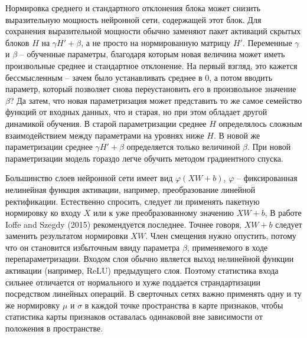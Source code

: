 \documentclass[%
	11pt,
	a4paper,
	utf8,
]{article}
\begin{document}
Нормировка среднего и стандартного отклонения блока может снизить выразительную мощность нейронной сети, содержащей этот блок. Для сохранения выразительной мощности обычно заменяют пакет активаций скрытых блоков $ H $ на $ \gamma H' + \beta $, а не просто на нормированную матрицу $ H' $. Переменные $ \gamma $ и $ \beta $ -- обученные параметры, благодаря которым новая величина может иметь произвольные среднее и стандартное отклонение. На первый взгляд, это кажется бессмысленным -- зачем было устанавливать среднее в 0, а потом вводить параметр, который позволяет снова переустановить его в произвольное значение $ \beta $? Да затем, что новая параметризация может представить то же самое семейство функций от входных данных, что и старая, но при этом обладает другой динамикой обучения. В старой параметризации среднее $ H $ определялось сложным взаимодействием между параметрами на уровнях ниже $ H $. В новой же параметризации среднее $ \gamma H' +\beta $ определяется только величиной $ \beta $. При новой параметризации модель гораздо легче обучить методом градиентного спуска.

Большинство слоев нейронной сети имеет вид $ \varphi (X W +b) $, $ \varphi $ -- фиксированная нелинейная функция активации, например, преобразование линейной ректификации. Естественно спросить, следует ли применять пакетную нормировку ко входу $ X $ или к уже преобразованному значению $ X W +b $, В работе Ioffe and Szegdy (2015) рекомендуется последнее. Точнее говоря, $ X W + b $ следует заменить результатом нормировки $ X W $. Член смещения нужно опустить, потому что он становится избыточным ввиду параметра $ \beta $, применяемого в ходе перепараметризации. Входом слоя обычно является выход нелинейной функции активации (например, ReLU) предыдущего слоя. Поэтому статистика входа сильнее отличается от нормального и хуже поддается страндартизации посредством линейных операций. В сверточных сетях важно применять одну и ту же нормировку $ \mu $ и $ \sigma $ в каждой точке пространства в карте признаков, чтобы статистика карты признаков оставалась одинаковой вне зависимости от положения в пространстве.









\begin{thebibliography}{99}
	
\end{thebibliography}


\end{document}
